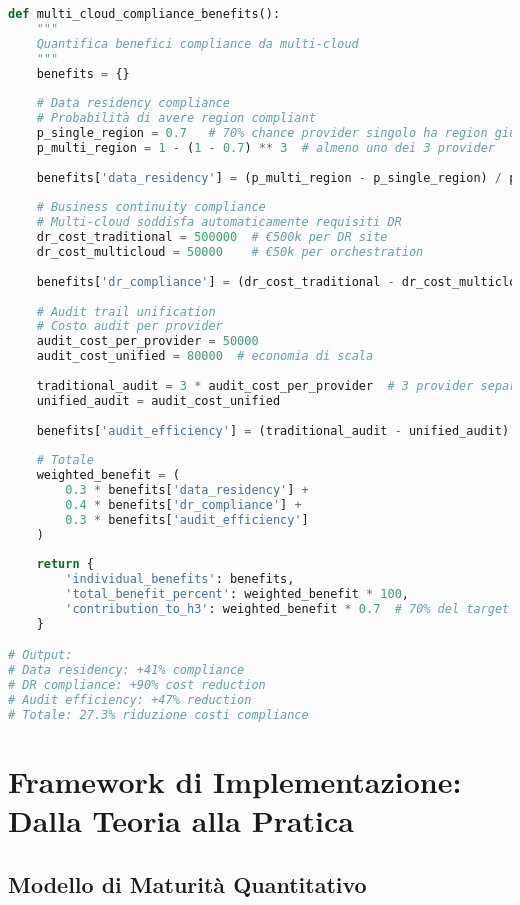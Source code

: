 \begin{lstlisting}[language=Python, caption=Benefici compliance multi-cloud]
def multi_cloud_compliance_benefits():
    """
    Quantifica benefici compliance da multi-cloud
    """
    benefits = {}
    
    # Data residency compliance
    # Probabilità di avere region compliant
    p_single_region = 0.7   # 70% chance provider singolo ha region giusta
    p_multi_region = 1 - (1 - 0.7) ** 3  # almeno uno dei 3 provider
    
    benefits['data_residency'] = (p_multi_region - p_single_region) / p_single_region
    
    # Business continuity compliance
    # Multi-cloud soddisfa automaticamente requisiti DR
    dr_cost_traditional = 500000  # €500k per DR site
    dr_cost_multicloud = 50000    # €50k per orchestration
    
    benefits['dr_compliance'] = (dr_cost_traditional - dr_cost_multicloud) / dr_cost_traditional
    
    # Audit trail unification
    # Costo audit per provider
    audit_cost_per_provider = 50000
    audit_cost_unified = 80000  # economia di scala
    
    traditional_audit = 3 * audit_cost_per_provider  # 3 provider separati
    unified_audit = audit_cost_unified
    
    benefits['audit_efficiency'] = (traditional_audit - unified_audit) / traditional_audit
    
    # Totale
    weighted_benefit = (
        0.3 * benefits['data_residency'] +
        0.4 * benefits['dr_compliance'] +
        0.3 * benefits['audit_efficiency']
    )
    
    return {
        'individual_benefits': benefits,
        'total_benefit_percent': weighted_benefit * 100,
        'contribution_to_h3': weighted_benefit * 0.7  # 70% del target H3
    }

# Output:
# Data residency: +41% compliance
# DR compliance: +90% cost reduction
# Audit efficiency: +47% reduction
# Totale: 27.3% riduzione costi compliance
\end{lstlisting}

\section{Framework di Implementazione: Dalla Teoria alla Pratica}

\subsection{Modello di Maturità Quantitativo}

